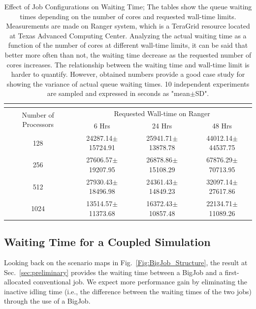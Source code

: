 \documentclass[preprint,12pt]{elsarticle}
\begin{document}
\begin{table}
  \caption{\small Effect of Job Configurations on Waiting Time; 
The tables show the queue waiting times 
depending on the number of cores and requested wall-time limits.
Measurements are made on Ranger system,
which is a TeraGrid resource located at Texas Advanced Computing Center.
Analyzing the actual waiting time as a function of 
the number of cores at different wall-time limits, 
it can be said that better more often than not, 
the waiting time decrease as the requested number of cores increases. 
The relationship between the waiting time and wall-time limit is harder 
to quantify. However, obtained numbers provide a good case study 
for showing the variance of actual queue waiting times. 
10 independent experiments are sampled and expressed in seconds as "mean$\pm$SD".}
  \label{table:WaitTime}
  \centering
\footnotesize
  \begin{tabular}{c || c c c}
 \multicolumn{4}{c}{\phantom{\tiny 100}}\\
\hline
 \multirow{2}{0.15\textwidth}{Number of Processors} &
 \multicolumn{3}{c}{Requested Wall-time on Ranger} \\
\cline{2-4}
& 6 Hrs & 24 Hrs & 48 Hrs\\
\hline			
128  &  24287.14\scriptsize{$\pm$15724.91}  &  25941.71\scriptsize{$\pm$13878.78}  &  44012.14\scriptsize{$\pm$44537.75} \\
256  &  27606.57\scriptsize{$\pm$19207.95}  &  26878.86\scriptsize{$\pm$15108.29}  &  67876.29\scriptsize{$\pm$70713.95} \\
512  &  27930.43\scriptsize{$\pm$18496.98}  &  24361.43\scriptsize{$\pm$14849.23}  &  32097.14\scriptsize{$\pm$27617.86} \\
1024  &  13514.57\scriptsize{$\pm$11373.68}  &  16372.43\scriptsize{$\pm$10857.48}  &  22134.71\scriptsize{$\pm$11089.26} \\

\hline
\end{tabular} %
\vspace{-1em}
\end{table}


\subsection{Waiting Time for a Coupled Simulation}
Looking back on the scenario maps in Fig.~\ref{Fig:BigJob_Structure},
the result at Sec.~\ref{sec:preliminary} provides the waiting time 
between a BigJob and a first-allocated conventional job.
We expect more performance gain by eliminating the inactive idling time
(i.e., the difference between the waiting times of the two jobs)
through the use of a BigJob. 
\end{document}
